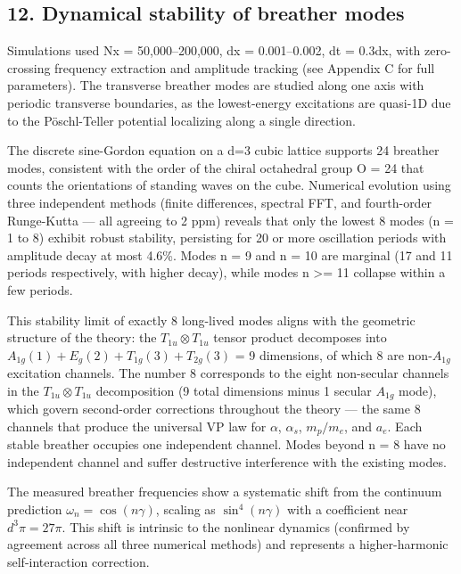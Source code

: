 \documentclass[
]{article}
\begin{document}
\subsection{12. Dynamical stability of breather
modes}\label{dynamical-stability-of-breather-modes}

Simulations used Nx = 50,000--200,000, dx = 0.001--0.002, dt = 0.3dx,
with zero-crossing frequency extraction and amplitude tracking (see
Appendix C for full parameters). The transverse breather modes are
studied along one axis with periodic transverse boundaries, as the
lowest-energy excitations are quasi-1D due to the Pöschl-Teller
potential localizing along a single direction.

The discrete sine-Gordon equation on a d=3 cubic lattice supports 24
breather modes, consistent with the order of the chiral octahedral group
\textbar O\textbar{} = 24 that counts the orientations of standing waves
on the cube. Numerical evolution using three independent methods (finite
differences, spectral FFT, and fourth-order Runge-Kutta --- all agreeing
to 2 ppm) reveals that only the lowest 8 modes (n = 1 to 8) exhibit
robust stability, persisting for 20 or more oscillation periods with
amplitude decay at most 4.6\%. Modes n = 9 and n = 10 are marginal (17
and 11 periods respectively, with higher decay), while modes n
\textgreater= 11 collapse within a few periods.

This stability limit of exactly 8 long-lived modes aligns with the
geometric structure of the theory: the \(T_{1u} \otimes T_{1u}\) tensor
product decomposes into \(A_{1g}(1) + E_g(2) + T_{1g}(3) + T_{2g}(3)\) =
9 dimensions, of which 8 are non-\(A_{1g}\) excitation channels. The
number 8 corresponds to the eight non-secular channels in the
\(T_{1u} \otimes T_{1u}\) decomposition (9 total dimensions minus 1
secular \(A_{1g}\) mode), which govern second-order corrections
throughout the theory --- the same 8 channels that produce the universal
VP law for \(\alpha\), \(\alpha_s\), \(m_p/m_e\), and \(a_e\). Each
stable breather occupies one independent channel. Modes beyond n = 8
have no independent channel and suffer destructive interference with the
existing modes.

The measured breather frequencies show a systematic shift from the
continuum prediction \(\omega_n = \cos(n\gamma)\), scaling as
\(\sin^4(n\gamma)\) with a coefficient near \(d^3\pi = 27\pi\). This
shift is intrinsic to the nonlinear dynamics (confirmed by agreement
across all three numerical methods) and represents a higher-harmonic
self-interaction correction.
\end{document}
